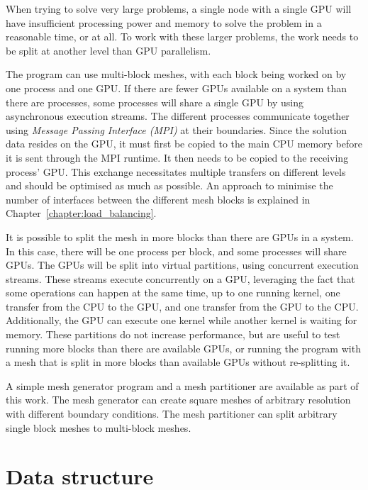 When trying to solve very large problems, a single node with a single GPU will have insufficient
processing power and memory to solve the problem in a reasonable time, or at all. To work with these
larger problems, the work needs to be split at another level than GPU parallelism.  

The program can use multi-block meshes, with each block being worked on by one process and one GPU.
If there are fewer GPUs available on a system than there are processes, some processes will share a
single GPU by using asynchronous execution streams. The different processes communicate together
using \textit{Message Passing Interface (MPI)} at their boundaries. Since the solution data resides
on the GPU, it must first be copied to the main CPU memory before it is sent through the MPI
runtime. It then needs to be copied to the receiving process' GPU. This exchange necessitates
multiple transfers on different levels and should be optimised as much as possible. An approach to
minimise the number of interfaces between the different mesh blocks is explained in
Chapter~\ref{chapter:load_balancing}. 

It is possible to split the mesh in more blocks than there are GPUs in a system. In this case, there
will be one process per block, and some processes will share GPUs. The GPUs will be split into
virtual partitions, using concurrent execution streams. These streams execute concurrently on a GPU,
leveraging the fact that some operations can happen at the same time, up to one running kernel, one
transfer from the CPU to the GPU, and one transfer from the GPU to the CPU. Additionally, the GPU
can execute one kernel while another kernel is waiting for memory. These partitions do not increase
performance, but are useful to test running more blocks than there are available GPUs, or running
the program with a mesh that is split in more blocks than available GPUs without re-splitting it.

A simple mesh generator program and a mesh partitioner are available as part of this work. The mesh
generator can create square meshes of arbitrary resolution with different boundary conditions. The
mesh partitioner can split arbitrary single block meshes to multi-block meshes.

\section{Data structure} \label{section:graphics_processing_units:data_structure}

